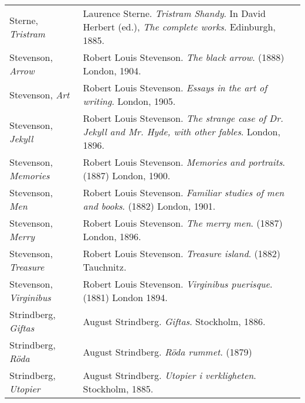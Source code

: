 \begin{longtable}{p{} p{}}
Sterne, \textit{Tristram} & Laurence Sterne. \textit{Tristram Shandy}. In David Herbert (ed.), \textit{The complete works}. Edinburgh, 1885. \\ 

Stevenson, \textit{Arrow} & Robert Louis Stevenson. \textit{The black arrow}. (1888) London, 1904.  \\
Stevenson, \textit{Art} & Robert Louis Stevenson. \textit{Essays in the art of writing}. London, 1905.  \\
Stevenson, \textit{Jekyll} & Robert Louis Stevenson. \textit{The strange case of Dr. Jekyll and Mr. Hyde, with other fables}. London, 1896. \\ %
Stevenson, \textit{Memories} & Robert Louis Stevenson. \textit{Memories and portraits}. (1887) London, 1900. \\  %
Stevenson, \textit{Men} & Robert Louis Stevenson. \textit{Familiar studies of men and books}. (1882) London, 1901. \\
Stevenson, \textit{Merry} & Robert Louis Stevenson. \textit{The merry men}. (1887) London, 1896.  \\
Stevenson, \textit{Treasure} & Robert Louis Stevenson. \textit{Treasure island}. (1882) Tauchnitz.  \\
Stevenson, \textit{Virginibus} & Robert Louis Stevenson. \textit{Virginibus puerisque}. (1881) London 1894.  \\
%

Strindberg, \textit{Giftas} & August Strindberg. \textit{Giftas}. Stockholm, 1886. \\
Strindberg, \textit{Röda} & August Strindberg. \textit{Röda rummet}. (1879) \\
Strindberg, \textit{Utopier} & August Strindberg. \textit{Utopier i verkligheten}. Stockholm, 1885. \\


\end{longtable}
